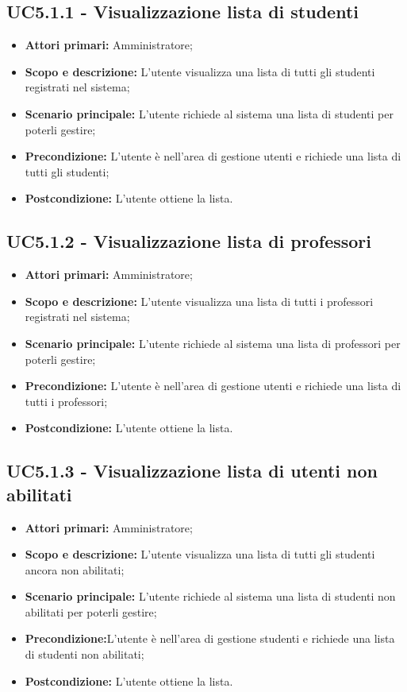 \documentclass[AnalisiDeiRequisiti.tex]{subfiles}
\begin{document}
\subsection{UC5.1.1 - Visualizzazione lista di studenti}
\begin{itemize}
	\item \textbf{Attori primari:} Amministratore;
	\item \textbf{Scopo e descrizione:} L'utente visualizza una lista di tutti gli studenti registrati nel sistema;
	\item \textbf{Scenario principale:} L'utente richiede al sistema una lista di studenti per poterli gestire;
	\item \textbf{Precondizione:} L'utente è nell'area di gestione utenti e richiede una lista di tutti gli studenti; 
	\item \textbf{Postcondizione:} L'utente ottiene la lista.
\end{itemize}
\subsection{UC5.1.2 - Visualizzazione lista di professori}
\begin{itemize}
	\item \textbf{Attori primari:} Amministratore;
	\item \textbf{Scopo e descrizione:} L'utente visualizza una lista di tutti i professori registrati nel sistema;
	\item \textbf{Scenario principale:} L'utente richiede al sistema una lista di professori per poterli gestire;
	\item \textbf{Precondizione:} L'utente è nell'area di gestione utenti e richiede una lista di tutti i professori; 
	\item \textbf{Postcondizione:} L'utente ottiene la lista.
\end{itemize}
\subsection{UC5.1.3 - Visualizzazione lista di utenti non abilitati}
\begin{itemize}
	\item \textbf{Attori primari:} Amministratore;
	\item \textbf{Scopo e descrizione:} L'utente visualizza una lista di tutti gli studenti ancora non abilitati;
	\item \textbf{Scenario principale:} L'utente richiede al sistema una lista di studenti non abilitati per poterli gestire;
	\item \textbf{Precondizione:}L'utente è nell'area di gestione studenti e richiede una lista di studenti non abilitati; 
	\item \textbf{Postcondizione:} L'utente ottiene la lista.
\end{itemize}
\end{document}
